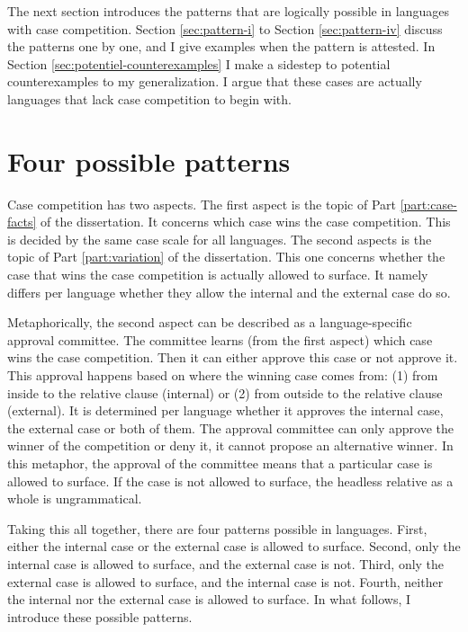 The next section introduces the patterns that are logically possible in languages with case competition. Section \ref{sec:pattern-i} to Section \ref{sec:pattern-iv} discuss the patterns one by one, and I give examples when the pattern is attested. In Section \ref{sec:potentiel-counterexamples} I make a sidestep to potential counterexamples to my generalization. I argue that these cases are actually languages that lack case competition to begin with.


\section{Four possible patterns}\label{sec:possible-patterns}

Case competition has two aspects. The first aspect is the topic of Part \ref{part:case-facts} of the dissertation. It concerns which case wins the case competition. This is decided by the same case scale for all languages. The second aspects is the topic of Part \ref{part:variation} of the dissertation. This one concerns whether the case that wins the case competition is actually allowed to surface. It namely differs per language whether they allow the internal and the external case do so.

Metaphorically, the second aspect can be described as a language-specific approval committee. The committee learns (from the first aspect) which case wins the case competition. Then it can either approve this case or not approve it. This approval happens based on where the winning case comes from: (1) from inside to the relative clause (internal) or (2) from outside to the relative clause (external). It is determined per language whether it approves the internal case, the external case or both of them. The approval committee can only approve the winner of the competition or deny it, it cannot propose an alternative winner. In this metaphor, the approval of the committee means that a particular case is allowed to surface. If the case is not allowed to surface, the headless relative as a whole is ungrammatical.

Taking this all together, there are four patterns possible in languages. First, either the internal case or the external case is allowed to surface. Second, only the internal case is allowed to surface, and the external case is not. Third, only the external case is allowed to surface, and the internal case is not. Fourth, neither the internal nor the external case is allowed to surface. In what follows, I introduce these possible patterns.

